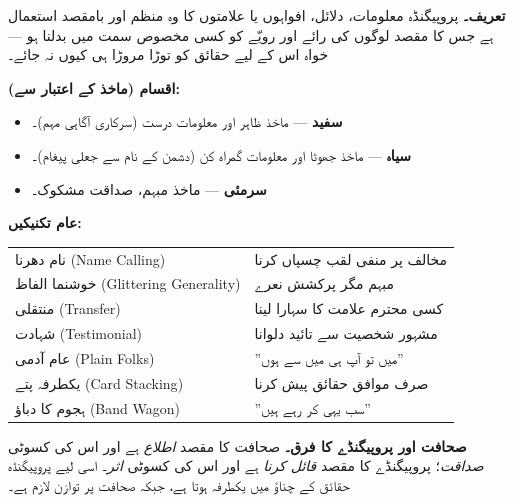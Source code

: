 \begin{hal}
\textbf{تعریف۔} پروپیگنڈہ معلومات، دلائل، افواہوں یا علامتوں کا وہ منظم اور
بامقصد استعمال ہے جس کا مقصد لوگوں کی رائے اور رویّے کو کسی مخصوص سمت میں
بدلنا ہو --- خواہ اس کے لیے حقائق کو توڑا مروڑا ہی کیوں نہ جائے۔

\medskip
\textbf{اقسام (ماخذ کے اعتبار سے):}
\begin{itemize}\setlength{\itemsep}{1pt}
  \item \textbf{سفید} --- ماخذ ظاہر اور معلومات درست (سرکاری آگاہی مہم)۔
  \item \textbf{سیاہ} --- ماخذ جھوٹا اور معلومات گمراہ کن (دشمن کے نام سے
        جعلی پیغام)۔
  \item \textbf{سرمئی} --- ماخذ مبہم، صداقت مشکوک۔
\end{itemize}

\textbf{عام تکنیکیں:}
\begin{center}
\begin{tabular}{@{}p{4.4cm} p{9.8cm}@{}}
\toprule
نام دھرنا (\textenglish{Name Calling}) & مخالف پر منفی لقب چسپاں کرنا \\
خوشنما الفاظ (\textenglish{Glittering Generality}) & مبہم مگر پرکشش نعرے \\
منتقلی (\textenglish{Transfer}) & کسی محترم علامت کا سہارا لینا \\
شہادت (\textenglish{Testimonial}) & مشہور شخصیت سے تائید دلوانا \\
عام آدمی (\textenglish{Plain Folks}) & ''میں تو آپ ہی میں سے ہوں'' \\
یکطرفہ پتے (\textenglish{Card Stacking}) & صرف موافق حقائق پیش کرنا \\
ہجوم کا دباؤ (\textenglish{Band Wagon}) & ''سب یہی کر رہے ہیں'' \\
\bottomrule
\end{tabular}
\end{center}

\medskip
\textbf{صحافت اور پروپیگنڈے کا فرق۔} صحافت کا مقصد \emph{اطلاع} ہے اور اس کی
کسوٹی \emph{صداقت}؛ پروپیگنڈے کا مقصد \emph{قائل کرنا} ہے اور اس کی کسوٹی
\emph{اثر}۔ اسی لیے پروپیگنڈہ حقائق کے چناؤ میں یکطرفہ ہوتا ہے، جبکہ صحافت پر
توازن لازم ہے۔

\end{hal}
